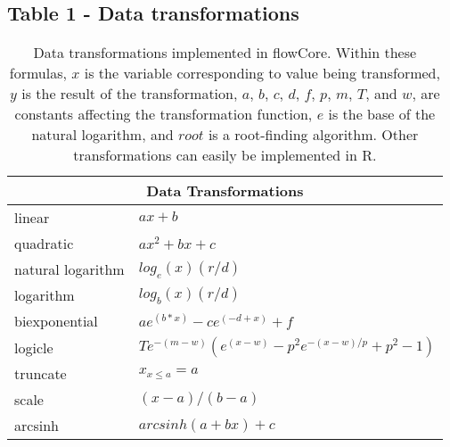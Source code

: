 \documentclass[10pt]{bmc_article}
\newcommand{\Rpackage}[1]{{\textsf{#1}}}
\newenvironment{bmcformat}{\begin{raggedright}\baselineskip20pt\sloppy\setboolean{publ}{false}}{\end{raggedright}\baselineskip20pt\sloppy}
\begin{document}
\begin{bmcformat}
  \subsection*{Table 1 - Data transformations}
    \begin{table}[ht]
      \caption{\label{table1} Data transformations implemented in \Rpackage{flowCore}. Within these formulas, $x$ is the variable
        corresponding to value being transformed, $y$ is the result of the
        transformation, $a$, $b$, $c$, $d$, $f$, $p$, $m$, $T$, and $w$, are
        constants affecting the transformation function, $e$ is the base of
        the natural logarithm, and $root$ is a root-finding algorithm. Other transformations can easily be implemented in R.}
      \begin{center}
        \begin{tabular}{|l|l|}
          \hline
          \multicolumn{2}{|c|}{Data Transformations} \\
          \hline
          linear & $ax + b$ \\
          quadratic & $ax^2 + bx + c$ \\
          natural logarithm & $log_e(x)(r/d)$ \\
          logarithm & $log_b(x)(r/d)$ \\
          biexponential & $ae^{(b*x)}-ce^{(-d+x)}+f$ \\
          logicle& $Te^{-(m-w)}(e^{(x-w)}-p^2e^{-(x-w)/p}+p^2-1)$ \\
          truncate & $x_{x{\leq}a} = a$ \\
          scale & $(x-a)/(b-a)$ \\
          arcsinh & $arcsinh(a + bx)+c$ \\
          \hline
        \end{tabular}
      \end{center}
    \end{table}


\end{bmcformat}
\end{document}
